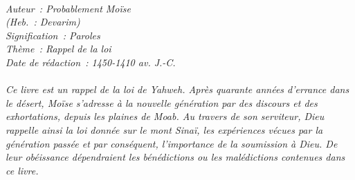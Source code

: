 \BFont
\noindent\hrulefill
{\footnotesize
\textit{
\bigskip
{\centering{}
\\Auteur~: Probablement Moïse
\\(Heb.~: Devarim)
\\Signification~: Paroles
\\Thème~: Rappel de la loi
\\Date de rédaction~: 1450-1410 av. J.-C.\\}
}
\textit{
\\Ce livre est un rappel de la loi de Yahweh. Après quarante années d'errance dans le désert, Moïse s'adresse à la nouvelle génération par des discours et des exhortations, depuis les plaines de Moab. Au travers de son serviteur, Dieu rappelle ainsi la loi donnée sur le mont Sinaï, les expériences vécues par la génération passée et par conséquent, l'importance de la soumission à Dieu. De leur obéissance dépendraient les bénédictions ou les malédictions contenues dans ce livre.\bigskip
}
}
\par\nobreak\noindent\hrulefill
